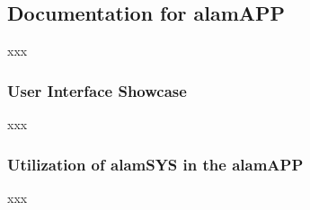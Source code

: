 \subsection{Documentation for alamAPP}
\label{subsec:doc_alamAPP}
xxx

\subsubsection{User Interface Showcase}
\label{subsubsec:alamAPP_UI}
xxx

\subsubsection{Utilization of alamSYS in the alamAPP}
\label{subsubsec:utilization_alamSYS-alamAPP}
xxx